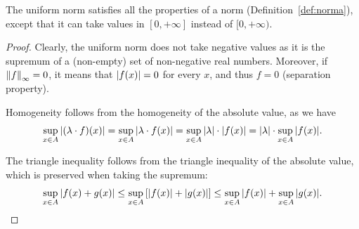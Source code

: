 \begin{theorem}
The uniform norm satisfies all the properties of a norm
(Definition~\ref{def:norma}), except that it can take values in $[0,+\infty]$
instead of $[0,+\infty)$.
\end{theorem}
%
\begin{proof}
Clearly, the uniform norm does not take negative values as it is the supremum of
a (non-empty) set of non-negative real numbers. Moreover, if ${\left\Vert f\right\Vert}_\infty=0$,
it means that ${\left|f(x)\right|}=0$ for every $x$, and thus $f=0$ (separation
property).

Homogeneity follows from the homogeneity of the absolute value, as we have
\[
  \sup_{x\in A} {\left|(\lambda \cdot f)(x)\right|}
  = \sup_{x\in A}{\left|\lambda \cdot f(x)\right|}
  = \sup_{x\in A}{\left|\lambda\right|}\cdot {\left|f(x)\right|}
  = {\left|\lambda\right|} \cdot \sup_{x\in A}{\left|f(x)\right|}.
\]

The triangle inequality follows from the triangle inequality of the absolute
value, which is preserved when taking the supremum:
\[
  \sup_{x\in A} {\left|f(x)+g(x)\right|}
  \le \sup_{x\in A} {\left[ {\left|f(x)\right|} + {\left|g(x)\right|} \right]}
  \le \sup_{x\in A} {\left|f(x)\right|} + \sup_{x\in A} {\left|g(x)\right|}.
\]
\end{proof}

